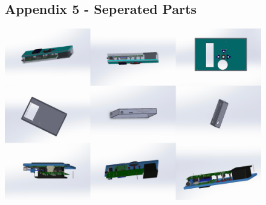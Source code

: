 \documentclass[11pt]{article}
\begin{document}
\begin{figure}
\subsection{Appendix 5 - Seperated Parts }
    \centering
    \includegraphics[width=1\textwidth]{Images/encl.png}
\end{figure}
\newpage
\end{document}
